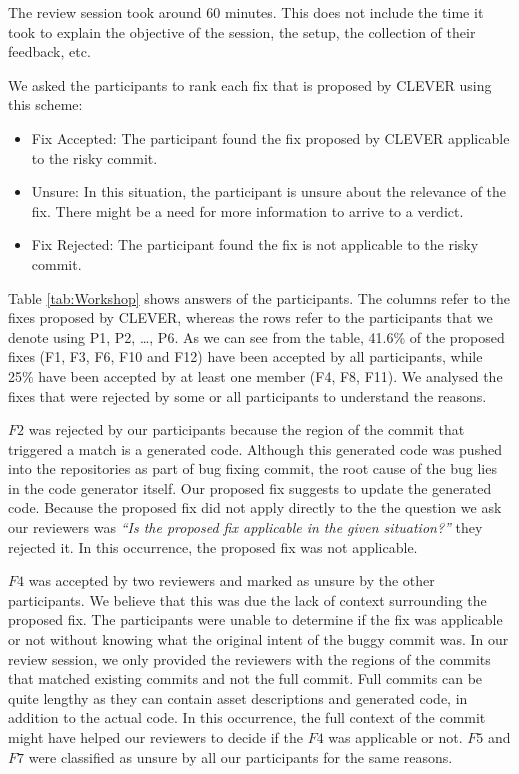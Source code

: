 \documentclass[sigconf]{acmart}
\providecommand{\tightlist}{%
  \setlength{\itemsep}{0pt}\setlength{\parskip}{0pt}}
\begin{document}
The review session took around 60 minutes. This does not include the
time it took to explain the objective of the session, the setup, the
collection of their feedback, etc.

We asked the participants to rank each fix that is proposed by CLEVER
using this scheme:

\begin{itemize}
\tightlist
\item
  Fix Accepted: The participant found the fix proposed by CLEVER
  applicable to the risky commit.
\item
  Unsure: In this situation, the participant is unsure about the
  relevance of the fix. There might be a need for more information to
  arrive to a verdict.
\item
  Fix Rejected: The participant found the fix is not applicable to the
  risky commit.
\end{itemize}

Table \ref{tab:Workshop} shows answers of the participants. The columns
refer to the fixes proposed by CLEVER, whereas the rows refer to the
participants that we denote using P1, P2, \ldots{}, P6. As we can see
from the table, 41.6\% of the proposed fixes (F1, F3, F6, F10 and F12)
have been accepted by all participants, while 25\% have been accepted by
at least one member (F4, F8, F11). We analysed the fixes that were
rejected by some or all participants to understand the reasons.

\(F2\) was rejected by our participants because the region of the commit
that triggered a match is a generated code. Although this generated code
was pushed into the repositories as part of bug fixing commit, the root
cause of the bug lies in the code generator itself. Our proposed fix
suggests to update the generated code. Because the proposed fix did not
apply directly to the the question we ask our reviewers was \emph{``Is
the proposed fix applicable in the given situation?''} they rejected it.
In this occurrence, the proposed fix was not applicable.

\(F4\) was accepted by two reviewers and marked as unsure by the other
participants. We believe that this was due the lack of context
surrounding the proposed fix. The participants were unable to determine
if the fix was applicable or not without knowing what the original
intent of the buggy commit was. In our review session, we only provided
the reviewers with the regions of the commits that matched existing
commits and not the full commit. Full commits can be quite lengthy as
they can contain asset descriptions and generated code, in addition to
the actual code. In this occurrence, the full context of the commit
might have helped our reviewers to decide if the \(F4\) was applicable
or not. \(F5\) and \(F7\) were classified as unsure by all our
participants for the same reasons.
\end{document}
